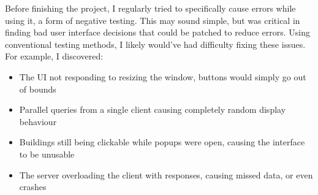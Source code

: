 Before finishing the project, I regularly tried to specifically cause errors while using it, a form of negative testing. This may sound simple, but was critical in finding bad user interface decisions that could be patched to reduce errors. Using conventional testing methods, I likely would've had difficulty fixing these issues. For example, I discovered:\begin{itemize}
    \item The UI not responding to resizing the window, buttons would simply go out of bounds
    \item Parallel queries from a single client causing completely random display behaviour
    \item Buildings still being clickable while popups were open, causing the interface to be unusable
    \item The server overloading the client with responses, causing missed data, or even crashes
\end{itemize}